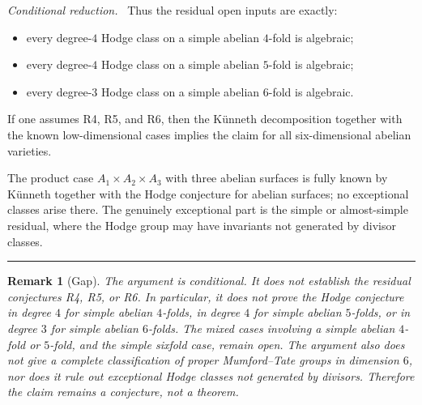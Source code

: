 \documentclass{article}
\newtheorem{remark}{Remark}
\newenvironment{proof}[1][Proof]{\par\noindent\textit{#1.}\ }{\hfill\rule{1.2ex}{1.2ex}\par}
\begin{document}
\begin{proof}[Conditional reduction]
Thus the residual open inputs are exactly:
\begin{itemize}
\item[\textbf{R4:}] every degree-\(4\) Hodge class on a simple abelian \(4\)-fold is algebraic;
\item[\textbf{R5:}] every degree-\(4\) Hodge class on a simple abelian \(5\)-fold is algebraic;
\item[\textbf{R6:}] every degree-\(3\) Hodge class on a simple abelian \(6\)-fold is algebraic.
\end{itemize}
If one assumes R4, R5, and R6, then the K\"unneth decomposition together with the known low-dimensional cases implies the claim for all six-dimensional abelian varieties.

The product case \(A_1 \times A_2 \times A_3\) with three abelian surfaces is fully known by K\"unneth together with the Hodge conjecture for abelian surfaces; no exceptional classes arise there. The genuinely exceptional part is the simple or almost-simple residual, where the Hodge group may have invariants not generated by divisor classes.
\end{proof}

\begin{remark}[Gap]
The argument is conditional. It does not establish the residual conjectures R4, R5, or R6. In particular, it does not prove the Hodge conjecture in degree \(4\) for simple abelian \(4\)-folds, in degree \(4\) for simple abelian \(5\)-folds, or in degree \(3\) for simple abelian \(6\)-folds. The mixed cases involving a simple abelian \(4\)-fold or \(5\)-fold, and the simple sixfold case, remain open. The argument also does not give a complete classification of proper Mumford--Tate groups in dimension \(6\), nor does it rule out exceptional Hodge classes not generated by divisors. Therefore the claim remains a conjecture, not a theorem.
\end{remark}
\end{document}
